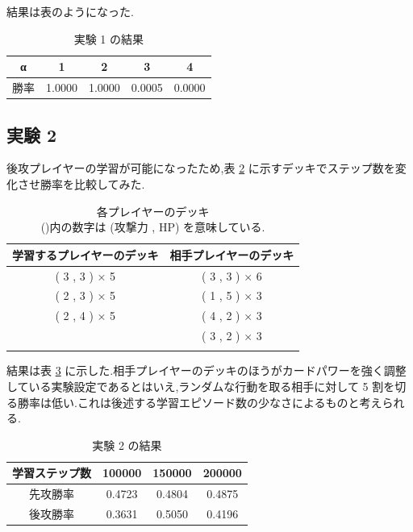 \documentclass{jarticle}     %
\begin{document}
結果は表のようになった.

\begin{table}[H]
  \centering
  \caption{実験 1 の結果}
  \label{table:result1}
  \begin{tabular}{c|cccc}
  α       & 1     & 2     & 3      & 4      \\
  \hline
  勝率 & 1.0000 & 1.0000 & 0.0005 & 0.0000 
  \end{tabular}
  \end{table}

\subsection{実験 2 }
後攻プレイヤーの学習が可能になったため,表 \ref{table:deck} に示すデッキでステップ数を変化させ勝率を比較してみた.

\begin{table}[H]
  \centering
  \caption{各プレイヤーのデッキ\\
  ()内の数字は (攻撃力 , HP) を意味している.}
  \begin{tabular}{cc}
  \multicolumn{1}{c}{学習するプレイヤーのデッキ} & \multicolumn{1}{c}{相手プレイヤーのデッキ} \\
  \hline
  ( 3 , 3 ) × 5          & ( 3 , 3 )  × 6         \\
  ( 2 , 3 ) × 5          & ( 1 , 5 ) × 3          \\
  ( 2 , 4 ) × 5          & ( 4 , 2 ) × 3          \\
                         & ( 3 , 2 ) × 3         \\
  \hline
  \label{table:deck}
  \end{tabular}
\end{table}

結果は表 \ref{table:result2} に示した.相手プレイヤーのデッキのほうがカードパワーを強く調整している実験設定であるとはいえ,ランダムな行動を取る相手に対して 5 割を切る勝率は低い.これは後述する学習エピソード数の少なさによるものと考えられる.

\begin{table}[H]
  \centering
  \caption{実験 2 の結果}
  \label{table:result2}
  \begin{tabular}{c|ccc}

  学習ステップ数 & 100000 & 150000 & 200000 \\
  \hline
  先攻勝率      & 0.4723 & 0.4804 & 0.4875 \\

  後攻勝率      & 0.3631 &  0.5050 &  0.4196  \\

  \end{tabular}
  \end{table}
\end{document}
